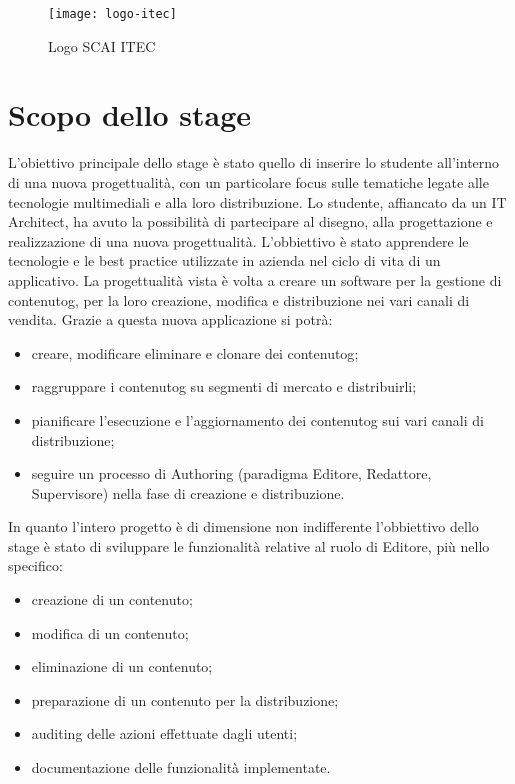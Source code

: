 \begin{figure}[h]
    \begin{center}
    \texttt{[image: logo-itec]}
    \caption{Logo SCAI ITEC}
    \label{fig:figure1}
    \end{center}
\end{figure}


\section{Scopo dello stage}
\label{sez:scopo}
L'obiettivo principale dello stage è stato quello di inserire lo studente all'interno di una nuova progettualità, con un particolare focus sulle tematiche legate alle tecnologie multimediali e alla loro distribuzione. Lo studente, affiancato da un IT Architect, ha avuto la possibilità di partecipare al disegno, alla progettazione e realizzazione di una nuova progettualità. L'obbiettivo è stato apprendere le tecnologie e le best practice utilizzate in azienda nel ciclo di vita di un applicativo.
La progettualità vista è volta a creare un software per la gestione di \gls{contenutog}\glsfirstoccur{}, per la loro creazione, modifica e distribuzione nei vari canali di vendita.
Grazie a questa nuova applicazione si potrà:
\begin{itemize}
    \item creare, modificare eliminare e clonare dei \gls{contenutog};
    \item raggruppare i \gls{contenutog} su segmenti di mercato e distribuirli;
    \item pianificare l’esecuzione e l’aggiornamento dei \gls{contenutog} sui vari canali di distribuzione;
    \item seguire un processo di Authoring (paradigma Editore, Redattore, Supervisore) nella fase di creazione e distribuzione.
\end{itemize} 
In quanto l'intero progetto è di dimensione non indifferente l'obbiettivo dello stage è stato di sviluppare le funzionalità relative al ruolo di Editore, più nello specifico:
\begin{itemize}
    \item creazione di un contenuto;
    \item modifica di un contenuto;
    \item eliminazione di un contenuto;
    \item preparazione di un contenuto per la distribuzione;
    \item auditing delle azioni effettuate dagli utenti;
    \item documentazione delle funzionalità implementate.
\end{itemize}

